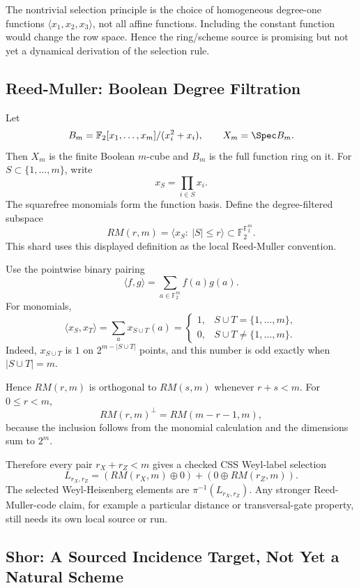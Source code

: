 The nontrivial selection principle is the choice of homogeneous degree-one
functions \(\langle x_1,x_2,x_3\rangle\), not all affine functions.  Including
the constant function would change the row space.  Hence the ring/scheme
source is promising but not yet a dynamical derivation of the selection rule.

\subsection{Reed-Muller: Boolean Degree Filtration}

Let
\[
  B_m=\mathbb F_2[x_1,\ldots,x_m]/(x_i^2+x_i),\qquad X_m=\Spec B_m .
\]
Then \(X_m\) is the finite Boolean \(m\)-cube and \(B_m\) is the full function
ring on it.  For \(S\subset\{1,\ldots,m\}\), write
\[
  x_S=\prod_{i\in S}x_i .
\]
The squarefree monomials form the function basis.  Define the degree-filtered
subspace
\[
  RM(r,m)=\langle x_S:\ |S|\le r\rangle\subset\mathbb F_2^{\mathbb F_2^m}.
\]
This shard uses this displayed definition as the local Reed-Muller convention.

Use the pointwise binary pairing
\[
  \langle f,g\rangle=\sum_{a\in\mathbb F_2^m} f(a)g(a).
\]
For monomials,
\[
  \langle x_S,x_T\rangle
  =
  \sum_a x_{S\cup T}(a)
  =
  \begin{cases}
  1,&S\cup T=\{1,\ldots,m\},\\
  0,&S\cup T\ne\{1,\ldots,m\}.
  \end{cases}
\]
Indeed, \(x_{S\cup T}\) is \(1\) on \(2^{m-|S\cup T|}\) points, and this number
is odd exactly when \(|S\cup T|=m\).

Hence \(RM(r,m)\) is orthogonal to \(RM(s,m)\) whenever \(r+s<m\).  For \(0\le r<m\),
\[
  RM(r,m)^\perp=RM(m-r-1,m),
\]
because the inclusion follows from the monomial calculation and the dimensions
sum to \(2^m\).

Therefore every pair \(r_X+r_Z<m\) gives a checked CSS Weyl-label selection
\[
  L_{r_X,r_Z}
  =
  (RM(r_X,m)\oplus0)+(0\oplus RM(r_Z,m)).
\]
The selected Weyl-Heisenberg elements are \(\pi^{-1}(L_{r_X,r_Z})\).  Any
stronger Reed-Muller-code claim, for example a particular distance or
transversal-gate property, still needs its own local source or run.

\subsection{Shor: A Sourced Incidence Target, Not Yet a Natural Scheme}


